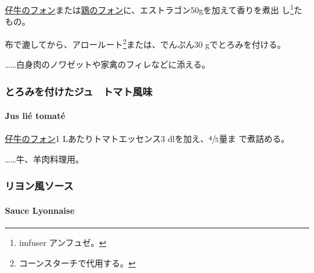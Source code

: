 \protect\hyperlink{fonds-de-veau-brun}{仔牛のフォン}または\protect\hyperlink{fonds-de-volaille}{鶏のフォン}に、エストラゴン50gを加えて香りを煮出
し\footnote{imfuser アンフュゼ。}たもの。

布で漉してから、アロールート\footnote{コーンスターチで代用する。}または、でんぷん30
gでとろみを付ける。

\ldots{}\ldots{}白身肉のノワゼットや家禽のフィレなどに添える。

\maeaki

\hypertarget{ux3068ux308dux307fux3092ux4ed8ux3051ux305fux30b8ux30e5ux30c8ux30deux30c8ux98a8ux5473}{%
\subsubsection{とろみを付けたジュ　トマト風味}\label{ux3068ux308dux307fux3092ux4ed8ux3051ux305fux30b8ux30e5ux30c8ux30deux30c8ux98a8ux5473}}

\hypertarget{jus-lie-tomate}{%
\paragraph{Jus lié tomaté}\label{jus-lie-tomate}}


\protect\hyperlink{fonds-de-veau-brun}{仔牛のフォン}1
Lあたりトマトエッセンス3 dlを加え、\(\sfrac{4}{5}\)量ま で煮詰める。

\ldots{}\ldots{}牛、羊肉料理用。

\maeaki

\hypertarget{ux30eaux30e8ux30f3ux98a8ux30bdux30fcux30b9}{%
\subsubsection{リヨン風ソース}\label{ux30eaux30e8ux30f3ux98a8ux30bdux30fcux30b9}}

\hypertarget{sauce-lyonnaise}{%
\paragraph{Sauce Lyonnaise}\label{sauce-lyonnaise}}



